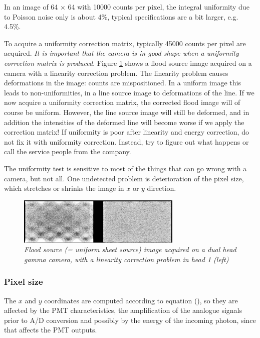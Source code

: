 In an image of 64 $\times$ 64 with 10000 counts per pixel, the integral
uniformity due to Poisson noise only is about 4\%, typical specifications are
a bit larger, e.g. 4.5\%.

To acquire a uniformity correction matrix, typically 45000 counts per pixel
are acquired. {\em It is important that the camera is in good shape when a
uniformity correction matrix is produced}. Figure \ref{fig:qc_linproblem}
shows a flood source image acquired on a camera with a linearity correction
problem. The linearity problem causes deformations in the image: counts are
mispositioned. In a uniform image this leads to non-uniformities, in a line
source image to deformations of the line. If we now acquire a uniformity
correction matrix, the corrected flood image will of course be uniform.
However, the line source image will still be deformed, and in addition the
intensities of the deformed line will become worse if we apply the correction
matrix! If uniformity is poor after linearity and energy correction, do not
fix it with uniformity correction. Instead, try to figure out what happens or
call the service people from the company.

The uniformity test is sensitive to most of the things that can go wrong with
a camera, but not all. One undetected problem is deterioration of the pixel
size, which stretches or shrinks the image in $x$ or $y$ direction.

\begin{figure}[tb]
\centering
\includegraphics[width=\figbig]{figs/fig_qc_linproblem.pdf}
\caption{\label{fig:qc_linproblem} \emph{Flood source (= uniform sheet source)
image acquired on a dual head gamma camera, with a linearity correction
problem in head 1 (left)}}
\end{figure}

\subsubsection{Pixel size}
The $x$ and $y$ coordinates are computed according to equation
(), so they are affected by the PMT characteristics, the
amplification of the analogue signals prior to A/D conversion and possibly by
the energy of the incoming photon, since that affects the PMT outputs.

